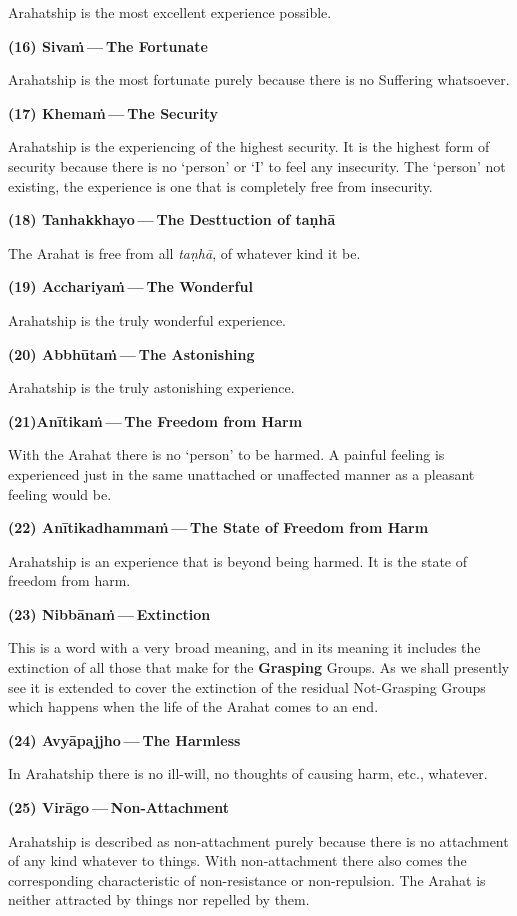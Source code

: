 Arahatship is the most excellent experience possible.

\textbf{(16) Sivaṁ --- The Fortunate}

Arahatship is the most fortunate purely because there is no Suffering whatsoever.

\textbf{(17) Khemaṁ --- The Security}

Arahatship is the experiencing of the highest security. It is the highest form of security because there is no `person' or `I' to feel any insecurity. The `person' not existing, the experience is one that is completely free from insecurity.

\textbf{(18) Tanhakkhayo --- The Desttuction of taṇhā}

The Arahat is free from all \emph{taṇhā}, of whatever kind it be.

\textbf{(19) Acchariyaṁ --- The Wonderful}

Arahatship is the truly wonderful experience.

\textbf{(20) Abbhūtaṁ --- The Astonishing}

Arahatship is the truly astonishing experience.

\textbf{(21)Anītikaṁ --- The Freedom from Harm}

With the Arahat there is no `person' to be harmed. A painful feeling is experienced just in the same unattached or unaffected manner as a pleasant feeling would be.

\textbf{(22) Anītikadhammaṁ --- The State of Freedom from Harm}

Arahatship is an experience that is beyond being harmed. It is the state of freedom from harm.

\textbf{(23) Nibbānaṁ --- Extinction}

This is a word with a very broad meaning, and in its meaning it includes the extinction of all those that make for the \textbf{Grasping} Groups. As we shall presently see it is extended to cover the extinction of the residual Not-Grasping Groups which happens when the life of the Arahat comes to an end.

\textbf{(24) Avyāpajjho --- The Harmless}

In Arahatship there is no ill-will, no thoughts of causing harm, etc., whatever.

\textbf{(25) Virāgo --- Non-Attachment}

Arahatship is described as non-attachment purely because there is no attachment of any kind whatever to things. With non-attachment there also comes the corresponding characteristic of non-resistance or non-repulsion. The Arahat is neither attracted by things nor repelled by them.

